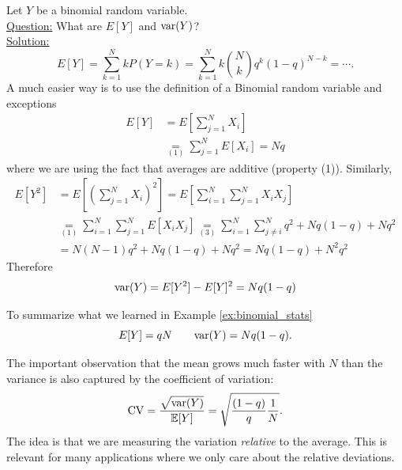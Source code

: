  
\begin{example}\label{ex:binomial_stats}
Let $Y$ be a binomial random variable. \\
 
 \noindent
\underline{Question:} What are $E[Y]$ and ${\rm var}(Y)$?\\
 
 
  \noindent
\underline{Solution:} 
\begin{equation*}
E[Y] = \sum_{k=1}^N k P(Y=k) =\sum_{k=1}^N k  {N \choose k}q^{k}(1-q)^{N-k} = \cdots. 
\end{equation*}
A much easier way is to use the definition of a Binomial random variable and exceptions 
\begin{align*}
E[Y] &= E\left[\sum_{j=1}^NX_i\right]\\
& \underset{(1)}{=}  \sum_{j=1}^NE\left[X_i\right]  =Nq
\end{align*}
where we are using the fact that averages are additive (property (1)). Similarly, 
\begin{align*}
E[Y^2] &= E\left[\left(\sum_{j=1}^NX_i\right)^2\right] = E\left[\sum_{i=1}^N\sum_{j=1}^NX_iX_j\right] \\
&\underset{(1)}{=}  \sum_{i=1}^N\sum_{j=1}^NE[X_iX_j]\underset{(3)}{=} \sum_{i=1}^N\sum_{j \ne i}^Nq^2 +  Nq(1-q) + Nq^2\\
&= N(N-1)q^2 + Nq(1-q)  +  Nq^2 = Nq(1-q)  + N^2q^2
\end{align*}
Therefore 
\begin{equation*}
{\rm var}(Y) =E[Y^2]-E[Y]^2 =  Nq(1-q)
\end{equation*}
\end{example}
 
To summarize what we learned in Example \ref{ex:binomial_stats}
\begin{equation}\label{eq:binomial_meanvar}
E[Y] = qN \quad\quad{\rm var}(Y) = Nq(1-q). 
\end{equation}


 
 The important observation that the mean grows much faster with $N$ than the variance is also captured by the coefficient of variation: 
\begin{equation*}
{\rm CV} = \frac{\sqrt{{\rm var}(Y)}}{\mathbb E[Y]} = \sqrt{\frac{(1-q)}{q} \frac{1}{N}}. 
\end{equation*}
The idea is that we are measuring the variation \emph{relative} to the average. This is relevant for many applications where we only care about the relative deviations. 

